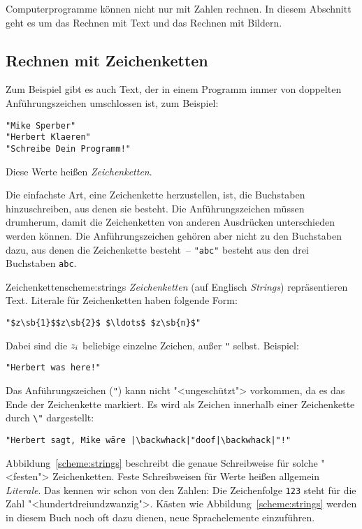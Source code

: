 Computerprogramme können nicht nur mit Zahlen rechnen.  In diesem
Abschnitt geht es um das Rechnen mit Text und das Rechnen mit Bildern.

\subsection{Rechnen mit Zeichenketten}

Zum Beispiel gibt es auch Text, der in einem Programm immer von
doppelten Anführungszeichen umschlossen ist, zum Beispiel:
%
\begin{lstlisting}
"Mike Sperber"
"Herbert Klaeren"
"Schreibe Dein Programm!"
\end{lstlisting}
%
Diese Werte heißen \textit{Zeichenketten}.

Die einfachste Art, eine Zeichenkette herzustellen, ist, die
Buchstaben hinzuschreiben, aus denen sie besteht.  Die
Anführungszeichen müssen drumherum, damit die Zeichenketten von anderen
Ausdrücken unterschieden werden können.  Die Anführungszeichen gehören aber nicht
zu den Buchstaben dazu, aus denen die Zeichenkette besteht~--
\lstinline{"abc"} besteht aus den drei Buchstaben \texttt{abc}.

\begin{feature}{Zeichenketten}{scheme:strings}
\textit{Zeichenketten} (auf Englisch
\textit{Strings}) repräsentieren Text.
Literale für Zeichenketten haben folgende Form:
%
\begin{lstlisting}
"$z\sb{1}$$z\sb{2}$ $\ldots$ $z\sb{n}$"
\end{lstlisting}
%
Dabei sind die \(z\sb{i}\) beliebige einzelne Zeichen, außer \lstinline{"} selbst.
Beispiel:
%
\begin{lstlisting}
"Herbert was here!"
\end{lstlisting}
%
Das Anführungszeichen (\lstinline{"}) kann nicht "<ungeschützt"> vorkommen, da es das Ende der
Zeichenkette markiert. Es wird als Zeichen innerhalb einer Zeichenkette
durch \lstinline{\"} dargestellt:
%
\begin{lstlisting}
"Herbert sagt, Mike wäre |\backwhack|"doof|\backwhack|"!"
\end{lstlisting}
\end{feature}

Abbildung~\ref{scheme:strings} beschreibt die genaue Schreibweise für
solche "<festen"> Zeichenketten.  Feste Schreibweisen für Werte heißen
allgemein \textit{Literale}.  Das kennen wir schon von
den Zahlen: Die Zeichenfolge \lstinline{123} steht für die Zahl
"<hundertdreiundzwanzig">.  Kästen wie Abbildung~\ref{scheme:strings}
werden in diesem Buch noch oft dazu dienen, neue Sprachelemente
einzuführen.

